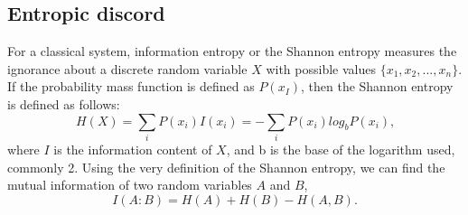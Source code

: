 \documentclass[%
 reprint,
 amsmath,amssymb,
 aps,
]{revtex4-1}
\begin{document}
\subsection{Entropic discord}
\noindent For a classical system, information entropy or the Shannon entropy measures the ignorance about a discrete random variable $X$ with possible values $\{x_1, x_2, ..., x_n\}$. If the probability mass function is defined as $P(x_I)$, then the Shannon entropy is defined as follows:
\begin{equation}
H(X) = \sum_{i} P(x_i) I(x_i) = -\sum_{i} P(x_i) log_b P(x_i) \text{,}
\end{equation}
\noindent where $I$ is the information content of $X$, and b is the base of the logarithm used, commonly 2. Using the very definition of the Shannon entropy, we can find the mutual information of two random variables $A$ and $B$,
\begin{equation}
I(A:B) = H(A) + H(B) - H(A,B) \text{.}
\end{equation}
\end{document}
